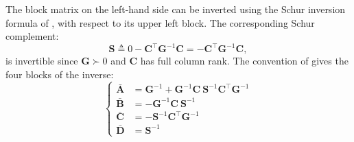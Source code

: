 The block matrix on the left-hand side can be inverted using the Schur inversion formula of , with respect to its upper left block. The corresponding Schur complement:
\begin{equation}
	\mathbf{S}\triangleq0-\mathbf{C}^\top \mathbf{G}^{-1}\mathbf{C}=-\mathbf{C}^\top \mathbf{G}^{-1}\mathbf{C},
\end{equation}
is invertible since $\mathbf{G}\succ0$ and $\mathbf{C}$ has full column rank. The convention of  gives the four blocks of the inverse:
\begin{equation}
	\left\{\begin{aligned}
	\bar{\mathbf{A}}&=\mathbf{G}^{-1}+\mathbf{G}^{-1}\mathbf{C}\:\mathbf{S}^{-1}\mathbf{C}^\top \mathbf{G}^{-1}\\
	\bar{\mathbf{B}}&=-\mathbf{G}^{-1}\mathbf{C}\:\mathbf{S}^{-1}\\
	\bar{\mathbf{C}}&=-\mathbf{S}^{-1}\mathbf{C}^\top \mathbf{G}^{-1}\\
	\bar{\mathbf{D}}&=\mathbf{S}^{-1}
	\end{aligned}\right.
\end{equation}

